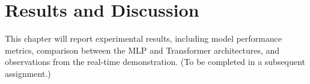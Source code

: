 \chapter{Results and Discussion}
\label{chap:results}

\par This chapter will report experimental results, including model performance metrics, comparison between the MLP and Transformer architectures, and observations from the real-time demonstration. (To be completed in a subsequent assignment.)
